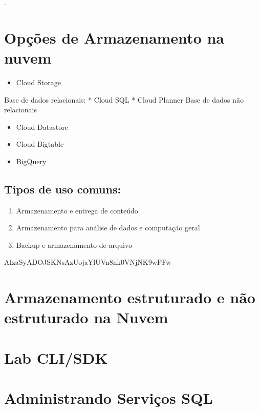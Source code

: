 \documentclass[
]{book}
\providecommand{\tightlist}{%
  \setlength{\itemsep}{0pt}\setlength{\parskip}{0pt}}
\begin{document}
.

\hypertarget{opuxe7uxf5es-de-armazenamento-na-nuvem}{%
\section{Opções de Armazenamento na nuvem}\label{opuxe7uxf5es-de-armazenamento-na-nuvem}}

\begin{itemize}
\tightlist
\item
  Cloud Storage
\end{itemize}

Base de dados relacionais:
* Cloud SQL
* Cloud Planner
Base de dados não relacionais

\begin{itemize}
\item
  Cloud Datastore
\item
  Cloud Bigtable
\item
  BigQuery
\end{itemize}

\hypertarget{tipos-de-uso-comuns}{%
\subsection{Tipos de uso comuns:}\label{tipos-de-uso-comuns}}

\begin{enumerate}
\def\labelenumi{\arabic{enumi}.}
\tightlist
\item
  Armazenamento e entrega de conteúdo
\item
  Armazenamento para análise de dados e computação geral
\item
  Backup e armazenamento de arquivo
\end{enumerate}

AIzaSyADOJSKNsAzUojaYlUVn8nk0VNjNK9wPFw

\hypertarget{armazenamento-estruturado-e-nuxe3o-estruturado-na-nuvem}{%
\section{Armazenamento estruturado e não estruturado na Nuvem}\label{armazenamento-estruturado-e-nuxe3o-estruturado-na-nuvem}}

\hypertarget{lab-clisdk}{%
\section{Lab CLI/SDK}\label{lab-clisdk}}

\hypertarget{administrando-serviuxe7os-sql}{%
\section{Administrando Serviços SQL}\label{administrando-serviuxe7os-sql}}
\end{document}
